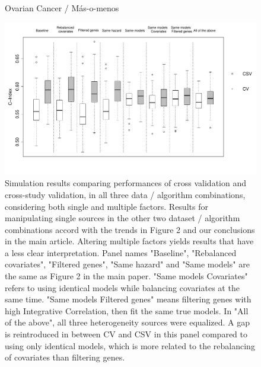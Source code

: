 \documentclass{article}
\begin{document}
   \begin{figure}[H]
   		\centering            
      		\centerline{Ovarian Cancer / M\'{a}s-o-menos}
            \includegraphics[width=16cm]{boxplot_ovarian_masomenos_allpanels_new.pdf}
         \caption{Simulation results comparing performances of cross validation and cross-study validation, in all three data / algorithm combinations, considering both single and multiple factors. Results for manipulating single sources in the other two dataset / algorithm combinations accord with the trends in Figure 2 and our conclusions in the main article. Altering multiple factors yields results that have a less clear interpretation. Panel names "Baseline", "Rebalanced covariates", "Filtered genes", "Same hazard" and "Same models" are the same as Figure 2 in the main paper. "Same models Covariates" refers to using identical models while balancing covariates at the same time. "Same models Filtered genes" means filtering genes with high Integrative Correlation, then fit the same true models. In "All of the above", all three heterogeneity sources were equalized. A gap is reintroduced in between CV and CSV in this panel compared to using only identical models, which is more related to the rebalancing of covariates than filtering genes.}
         \label{boxplots}
    \end{figure}         


\newpage
\end{document}
